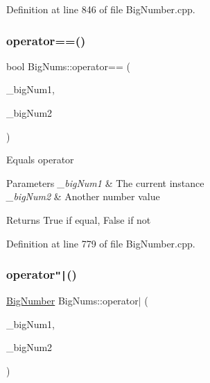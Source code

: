 Definition at line 846 of file Big\+Number.\+cpp.

\mbox{\label{namespace_big_nums_a850a2334f2158f7bbe71d1c6e9fad531}} 
\subsubsection{\texorpdfstring{operator==()}{operator==()}}
{\footnotesize\ttfamily bool Big\+Nums\+::operator== (\begin{DoxyParamCaption}\item[{const \mbox{\hyperlink{class_big_nums_1_1_big_number}{Big\+Number}} \&}]{\+\_\+big\+Num1,  }\item[{const \mbox{\hyperlink{class_big_nums_1_1_big_number}{Big\+Number}} \&}]{\+\_\+big\+Num2 }\end{DoxyParamCaption})}

Equals operator 
\begin{DoxyParams}{Parameters}
{\em \+\_\+big\+Num1} & The current instance \\
\hline
{\em \+\_\+big\+Num2} & Another number value \\
\hline
\end{DoxyParams}
\begin{DoxyReturn}{Returns}
True if equal, False if not 
\end{DoxyReturn}


Definition at line 779 of file Big\+Number.\+cpp.

\mbox{\label{namespace_big_nums_a3885538e918c8cb0cd96433da09462f0}} 
\subsubsection{\texorpdfstring{operator\texttt{"|}()}{operator|()}}
{\footnotesize\ttfamily \mbox{\hyperlink{class_big_nums_1_1_big_number}{Big\+Number}} Big\+Nums\+::operator$\vert$ (\begin{DoxyParamCaption}\item[{const \mbox{\hyperlink{class_big_nums_1_1_big_number}{Big\+Number}} \&}]{\+\_\+big\+Num1,  }\item[{const \mbox{\hyperlink{class_big_nums_1_1_big_number}{Big\+Number}} \&}]{\+\_\+big\+Num2 }\end{DoxyParamCaption})}

